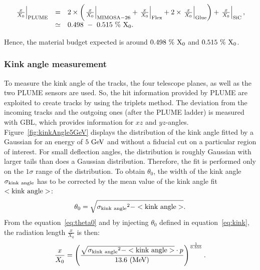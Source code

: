      \begin{equation}
       \begin{array}{lcl}
         \left. \frac{x}{X_0} \right|_{\rm{PLUME}} & = & 2 \times \left( \left. \frac{x}{X_0} \right|_{\rm{MIMOSA-26}} + \left. \frac{x}{X_0} \right|_{\rm{Flex}} + 2 \times \left. \frac{x}{X_0} \right|_{\rm{Glue}}\right) + \left. \frac{x}{X_0} \right|_{\rm{SiC}}, \\
         & \simeq & 0.498~-~0.515~\%~\rm{X_0}.
       \end{array}
     \end{equation}

     Hence, the material budget expected is around $0.498~\%~\rm{X_0}$ and $0.515~\%~\rm{X_0}$.

     \subsubsection{Kink angle measurement}

   To measure the kink angle of the tracks, the four telescope planes, as well as the two \gls{PLUME} sensors are used.
   So, the hit information provided by \gls{PLUME} are exploited to create tracks by using the triplets method.
   The deviation from the incoming tracks and the outgoing ones (after the \gls{PLUME} ladder) is measured with \gls{GBL}, which provides information for $xz$ and $yz$-angles.
   Figure~\ref{fig:kinkAngle5GeV} displays the distribution of the kink angle fitted by a Gaussian for an energy of $5~\rm{GeV}$ and without a fiducial cut on a particular region of interest.
   For small deflection angles, the distribution is roughly Gaussian with larger tails than does a Gaussian distribution\cite{Agashe:2014kda}.
   Therefore, the fit is performed only on the $1 \sigma$ range of the distribution.
   To obtain $\theta_0$, the width of the kink angle $\rm{\sigma_{kink~angle}}$ has to be corrected by the mean value of the kink angle fit $<\rm{kink~angle}>$:
   \begin{equation}
     \theta_0 = \sqrt{\rm{\sigma_{kink~angle}}^2 - <\rm{kink~angle}>}.
     \label{eq:kink}
   \end{equation}
   From the equation~\ref{eq:theta0} and by injecting $\theta_0$ defined in equation~\ref{eq:kink}, the radiation length $\frac{x}{X_0}$ is then:
   \begin{equation}
     \frac{x}{X_{0}} = \left( \frac{\sqrt{\rm{\sigma_{kink~angle}}^2 - <\rm{kink~angle}>} \cdot p}{13.6~\rm{(MeV)}} \right)^{\frac{1}{0.555}}.
   \end{equation}

